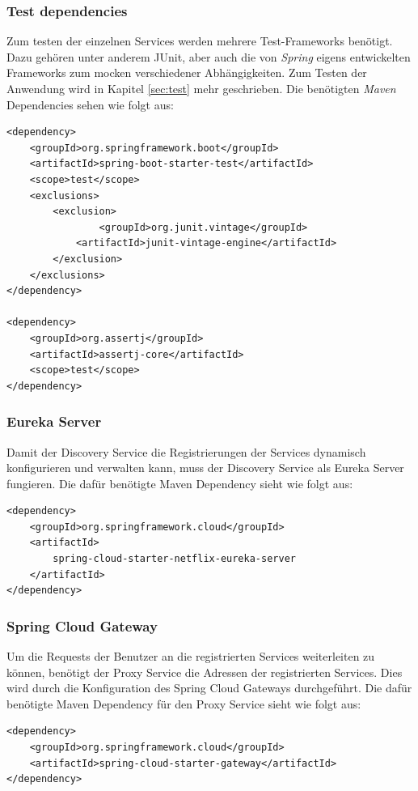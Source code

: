 \subsubsection*{Test dependencies}
Zum testen der einzelnen Services werden mehrere Test-Frameworks benötigt. Dazu gehören unter anderem JUnit, aber auch die von \textit{Spring} eigens entwickelten Frameworks zum mocken verschiedener Abhängigkeiten. Zum Testen der Anwendung wird in Kapitel \ref{sec:test} mehr geschrieben. Die benötigten \textit{Maven} Dependencies sehen wie folgt aus:
\begin{lstlisting}[caption={Test Dependencies}]
<dependency>
    <groupId>org.springframework.boot</groupId>
    <artifactId>spring-boot-starter-test</artifactId>
    <scope>test</scope>
    <exclusions>
        <exclusion>
                <groupId>org.junit.vintage</groupId>
            <artifactId>junit-vintage-engine</artifactId>
        </exclusion>
    </exclusions>
</dependency>

<dependency>
    <groupId>org.assertj</groupId>
    <artifactId>assertj-core</artifactId>
    <scope>test</scope>
</dependency>
\end{lstlisting}

\subsubsection*{Eureka Server}
Damit der Discovery Service die Registrierungen der Services dynamisch konfigurieren und verwalten kann, muss der Discovery Service als Eureka Server fungieren. Die dafür benötigte Maven Dependency sieht wie folgt aus:
\begin{lstlisting}[caption={Eureka Server Dependencies}]
<dependency>
    <groupId>org.springframework.cloud</groupId>
    <artifactId>
        spring-cloud-starter-netflix-eureka-server
    </artifactId>
</dependency>
\end{lstlisting}

\subsubsection*{Spring Cloud Gateway}
Um die Requests der Benutzer an die registrierten Services weiterleiten zu können, benötigt der Proxy Service die Adressen der registrierten Services. Dies wird durch die Konfiguration des Spring Cloud Gateways durchgeführt. Die dafür benötigte Maven Dependency für den Proxy Service sieht wie folgt aus: 
\begin{lstlisting}[caption={Spring Cloud Gateway Dependencies}]
<dependency>
    <groupId>org.springframework.cloud</groupId>
    <artifactId>spring-cloud-starter-gateway</artifactId>
</dependency>
\end{lstlisting}

